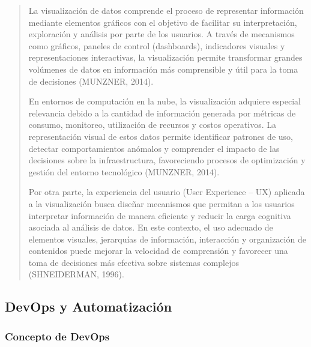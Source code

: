 \documentclass[
]{article}
\begin{document}
\begin{quote}
La visualización de datos comprende el proceso de representar
información mediante elementos gráficos con el objetivo de facilitar su
interpretación, exploración y análisis por parte de los usuarios. A
través de mecanismos como gráficos, paneles de control (dashboards),
indicadores visuales y representaciones interactivas, la visualización
permite transformar grandes volúmenes de datos en información más
comprensible y útil para la toma de decisiones (MUNZNER, 2014).

En entornos de computación en la nube, la visualización adquiere
especial relevancia debido a la cantidad de información generada por
métricas de consumo, monitoreo, utilización de recursos y costos
operativos. La representación visual de estos datos permite identificar
patrones de uso, detectar comportamientos anómalos y comprender el
impacto de las decisiones sobre la infraestructura, favoreciendo
procesos de optimización y gestión del entorno tecnológico (MUNZNER,
2014).

Por otra parte, la experiencia del usuario (User Experience -- UX)
aplicada a la visualización busca diseñar mecanismos que permitan a los
usuarios interpretar información de manera eficiente y reducir la carga
cognitiva asociada al análisis de datos. En este contexto, el uso
adecuado de elementos visuales, jerarquías de información, interacción y
organización de contenidos puede mejorar la velocidad de comprensión y
favorecer una toma de decisiones más efectiva sobre sistemas complejos
(SHNEIDERMAN, 1996).
\end{quote}

\subsection{DevOps y Automatización}\label{devops-y-automatizaciuxf3n}

\subsubsection{Concepto de DevOps}\label{concepto-de-devops}
\end{document}
